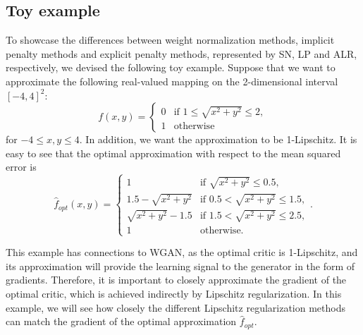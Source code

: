 \documentclass{article}
\begin{document}
\subsection{Toy example} \label{toy_example}
To showcase the differences between weight normalization methods, implicit penalty methods and explicit penalty methods, represented by SN, LP and ALR, respectively, we devised the following toy example. Suppose that we want to approximate the following real-valued mapping on the 2-dimensional interval $[-4, 4]^2$:
\begin{equation} \label{target}
f(x, y)=
\begin{cases}
    0 & \text{if } 1 \leq \sqrt{x^2 + y^2} \leq 2,\\
    1 & \text{otherwise}
\end{cases}
\end{equation}
for $-4 \leq x, y \leq 4$. In addition, we want the approximation to be 1-Lipschitz. It is easy to see that the optimal approximation with respect to the mean squared error is
\begin{equation}
\hat{f}_{opt}(x, y)=
\begin{cases}
    1                      & 
    	\text{if } \sqrt{x^2 + y^2} \leq 0.5,\\
    1.5 - \sqrt{x^2 + y^2} & 
    	\text{if } 0.5 < \sqrt{x^2 + y^2} \leq 1.5,\\
    \sqrt{x^2 + y^2} - 1.5 & 
    	\text{if } 1.5 < \sqrt{x^2 + y^2} \leq 2.5,\\

    1                      & 
    	\text{otherwise}.
\end{cases}.
\end{equation}

This example has connections to WGAN, as the optimal critic is 1-Lipschitz, and its approximation will provide the learning signal to the generator in the form of gradients. Therefore, it is important to closely approximate the gradient of the optimal critic, which is achieved indirectly by Lipschitz regularization. In this example, we will see how closely the different Lipschitz regularization methods can match the gradient of the optimal approximation $\hat{f}_{opt}$. 
\end{document}
